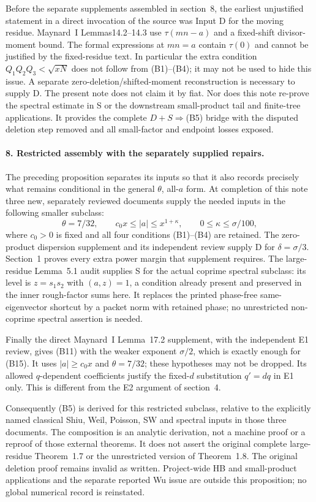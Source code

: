 Before the separate supplements assembled in section~8, the earliest
unjustified statement in a direct invocation of the source was Input D
for the moving residue. Maynard~I
Lemmas14.2--14.3 use $\tau(mn-a)$ and a fixed-shift divisor-moment
bound. The formal expressions at $mn=a$ contain $\tau(0)$ and
cannot be justified by the fixed-residue text. In particular the
extra condition $Q_1Q_2Q_3<\sqrt{xN}$ does not follow from
(B1)--(B4); it may not be used to hide this issue. A separate
zero-deletion/shifted-moment reconstruction is necessary to supply D.
The present note does not claim it by fiat. Nor does this note
re-prove the spectral estimate in S or the downstream small-product
tail and finite-tree applications. It provides the complete
$D+S\Longrightarrow$(B5) bridge with the disputed deletion step
removed and all small-factor and endpoint losses exposed.

\paragraph{8. Restricted assembly with the separately supplied repairs.}
The preceding proposition separates its inputs so that it also records
precisely what remains conditional in the general $\theta$, all-$a$
form.  At completion of this note three new, separately reviewed
documents supply the needed inputs in the following smaller subclass:
\[
 \theta=7/32,\qquad c_0x\le |a|\le x^{1+\kappa},\qquad
 0\le\kappa\le\sigma/100,
\]
where $c_0>0$ is fixed and all four conditions (B1)--(B4) are retained.
The zero-product dispersion supplement and its independent review
supply D for $\delta=\sigma/3$.  Section~1 proves every extra power
margin that supplement requires.  The large-residue Lemma~5.1 audit
supplies S for the actual coprime spectral subclass: its level is
$z=s_1s_2$ with $(a,z)=1$, a condition already present and preserved
in the inner rough-factor sums here.  It replaces the printed
phase-free same-eigenvector shortcut by a packet norm with retained
phase; no unrestricted non-coprime spectral assertion is needed.

Finally the direct Maynard~I Lemma~17.2 supplement, with the independent
E1 review, gives (B11) with the weaker exponent $\sigma/2$, which is
exactly enough for (B15).  It uses $|a|\ge c_0x$ and $\theta=7/32$;
these hypotheses may not be dropped.  Its allowed $q$-dependent
coefficients justify the fixed-$d$ substitution $q'=dq$ in E1 only.
This is different from the E2 argument of section~4.

Consequently (B5) is derived for this restricted subclass, relative
to the explicitly named classical Shiu, Weil, Poisson, SW and spectral
inputs in those three documents.  The composition is an analytic
derivation, not a machine proof or a reproof of those external
theorems.  It does not assert the original complete large-residue
Theorem~1.7 or the unrestricted version of Theorem~1.8.  The original
deletion proof remains invalid as written.  Project-wide HB and
small-product applications and the separate reported Wu issue are
outside this proposition; no global numerical record is reinstated.
